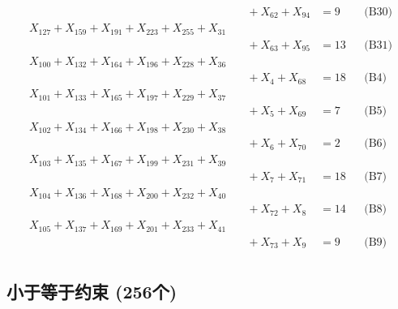 \documentclass[a4paper,10pt]{article}
\begin{document}
{\begin{align}
&\quad  + X_{62} + X_{94} &= 9 && \text{(B30)} \\
X_{127} + X_{159} + X_{191} + X_{223} + X_{255} + X_{31} \\[0.5ex]
&\quad  + X_{63} + X_{95} &= 13 && \text{(B31)} \\
X_{100} + X_{132} + X_{164} + X_{196} + X_{228} + X_{36} \\[0.5ex]
&\quad  + X_{4} + X_{68} &= 18 && \text{(B4)} \\
X_{101} + X_{133} + X_{165} + X_{197} + X_{229} + X_{37} \\[0.5ex]
&\quad  + X_{5} + X_{69} &= 7 && \text{(B5)} \\
X_{102} + X_{134} + X_{166} + X_{198} + X_{230} + X_{38} \\[0.5ex]
&\quad  + X_{6} + X_{70} &= 2 && \text{(B6)} \\
X_{103} + X_{135} + X_{167} + X_{199} + X_{231} + X_{39} \\[0.5ex]
&\quad  + X_{7} + X_{71} &= 18 && \text{(B7)} \\
X_{104} + X_{136} + X_{168} + X_{200} + X_{232} + X_{40} \\[0.5ex]
&\quad  + X_{72} + X_{8} &= 14 && \text{(B8)} \\
X_{105} + X_{137} + X_{169} + X_{201} + X_{233} + X_{41} \\[0.5ex]
&\quad  + X_{73} + X_{9} &= 9 && \text{(B9)} \\
\allowbreak
\end{align}}

\subsection{小于等于约束 (256个)}
\end{document}
